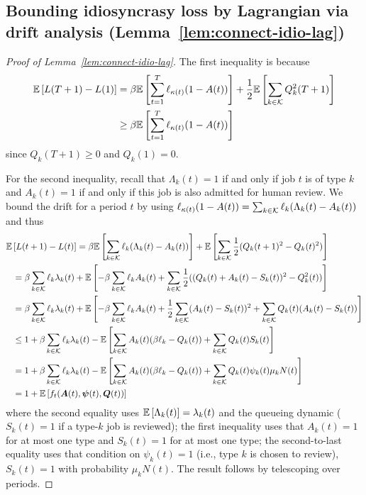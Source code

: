 \subsection{Bounding idiosyncrasy loss by Lagrangian via drift analysis (Lemma~\ref{lem:connect-idio-lag})}\label{app:lem-connect-idio-lag}
\begin{proof}[Proof of Lemma~\ref{lem:connect-idio-lag}] The first inequality is because 
\begin{align*}
\mathbb E\left[L(T+1)-L(1)\right]&=\beta\mathbb E\left[\sum_{t=1}^{T}\ell_{\kappa(t)}(1-A(t))\right] + \frac{1}{2}\mathbb E\left[\sum_{k \in \mathcal{K}} Q_k^2(T+1)\right] \\
&\geq \beta\mathbb E\left[\sum_{t=1}^{T}\ell_{\kappa(t)}(1-A(t))\right]
\end{align*}
since $Q_k(T+1) \geq 0$ and $Q_k(1) = 0$.

For the second inequality, recall that $\Lambda_k(t) = 1$ if and only if job $t$ is of type $k$ and $A_k(t) = 1$ if and only if this job is also admitted for human review. We bound the drift for a period $t$ by using $\ell_{\kappa(t)}(1-A(t)) = \sum_{k \in \mathcal{K}} \ell_k(\Lambda_k(t)-A_k(t))$ and thus
\begin{align*}
\expect{L(t+1) - L(t)} &= \beta\expect{\sum_{k \in \set{K}} \ell_k(\Lambda_k(t) - A_k(t))} + \expect{\sum_{k \in \set{K}} \frac{1}{2}(Q_k(t+1)^2 - Q_k(t)^2)} \\
&\hspace{-1in}= \beta\sum_{k \in \set{K}} \ell_k \lambda_k(t) + \expect{-\beta\sum_{k \in \set{K}} \ell_k A_k(t) + \sum_{k \in \set{K}} \frac{1}{2}((Q_k(t) + A_k(t) - S_k(t))^2 - Q^2_k(t))} \\
&\hspace{-1in}= \beta\sum_{k \in \set{K}} \ell_k \lambda_k(t) + \expect{-\beta\sum_{k \in \set{K}} \ell_k A_k(t) + \frac{1}{2}\sum_{k \in \set{K}} (A_k(t) - S_k(t))^2 + \sum_{k \in \set{K}} Q_k(t)(A_k(t) - S_k(t))} \\
&\hspace{-1in}\leq 1 + \beta\sum_{k \in \set{K}} \ell_k \lambda_k(t) - \expect{\sum_{k \in \set{K}} A_k(t)(\beta \ell_k - Q_k(t)) + \sum_{k \in \set{K}} Q_k(t)S_k(t)} \\
&\hspace{-1in}= 1 + \beta\sum_{k \in \set{K}} \ell_k\lambda_k(t) - \expect{\sum_{k \in \set{K}} A_k(t)(\beta \ell_k - Q_k(t)) + \sum_{k \in \set{K}} Q_k(t)\psi_k(t)\mu_k N(t)} \\
&\hspace{-1in}= 1 + \expect{f_t(\bolds{A}(t),\bolds{\psi}(t), \bolds{Q}(t))}
\end{align*}
where the second equality uses $\mathbb E\left[\Lambda_k(t)\right] = \lambda_k(t)$ and the queueing dynamic ($S_k(t) = 1$ if a type-$k$ job is reviewed); the first inequality uses that $A_k(t) = 1$ for at most one type and $S_k(t) = 1$ for at most one type; the second-to-last equality uses that condition on $\psi_k(t) = 1$ (i.e., type $k$ is chosen to review), $S_k(t) = 1$ with probability $\mu_k N(t)$. The result follows by telescoping over periods.
\end{proof}
